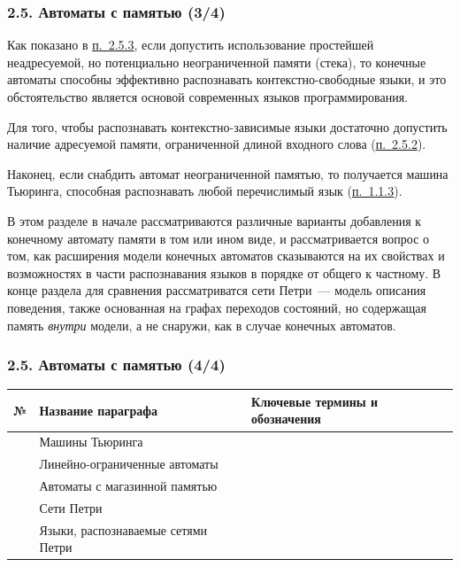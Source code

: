 \documentclass[mathserif,12pt,aspectratio=169]{beamer}
\def\emразделенной{\em разделенной}
\def\em#1{\it\color{blue}#1}
\def\DMref#1#2{{\color{blue}\underline{\hyperlink{#2}{#1}}}}
\begin{document}
\begin{frame}
\frametitle{2.5. Автоматы с памятью (3/4)}

Как показано в \DMref{п.~2.5.3}{2.5.3.}, если допустить использование
простейшей неадресуемой, но потенциально неограниченной памяти (стека), то конечные автоматы
способны эффективно распознавать контекстно-свободные языки, и это
обстоятельство является основой современных языков программирования.

\smallskip
Для того, чтобы распознавать контекстно-зависимые языки достаточно допустить
наличие адресуемой памяти, ограниченной длиной входного слова 
(\DMref{п.~2.5.2}{2.5.2.}). 

\smallskip
Наконец, если снабдить автомат неограниченной памятью, то получается машина
Тьюрин\-га, способная распознавать любой перечислимый язык (\DMref{п.~1.1.3}{1.1.3.}).

\smallskip
В этом разделе  в начале рассматриваются различные варианты добавления к конечному
автомату памяти в том или ином виде, и рассматривается вопрос о том, как
расширения модели конечных автоматов сказываются на их свойствах и возможностях
в части распознавания языков в порядке от общего к частному.
В конце раздела для сравнения рассматриватся сети Петри~--- модель описания 
поведения, также основанная на графах переходов состояний, но содержащая память 
{\em внутри} модели, а не снаружи, как в случае конечных автоматов.  
\end{frame}

\begin{frame}
\frametitle{2.5. Автоматы с памятью (4/4)}
\begin{tabular}{p{10mm}|p{42mm}|p{91mm}}
  № & Название параграфа
  & Ключевые термины и обозначения \\
  \hline
 \text{\DMref{2.5.1.}{2.5.1.}} &  Машины Тьюринга
  & {  
 }
   \\
\text{\DMref{2.5.2.}{2.5.2.}} & Линейно-ограниченные автоматы 
  & 
{ 
}
  \\
\text{\DMref{2.5.3.}{2.5.3.}}  & Автоматы с магазинной памятью &
{
}
\\
\text{\DMref{2.5.4.}{2.5.4.}}  & Сети Петри &
{
 } 
\\
\text{\DMref{2.5.5.}{2.5.5.}}  & Языки, распознаваемые сетями Петри &
{
 } 
\end{tabular}


\end{frame}
\end{document}
